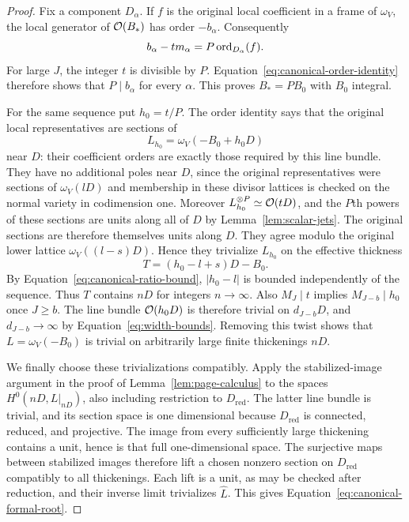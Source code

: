\begin{proof}
Fix a component $D_\alpha$. If $f$ is the original local
coefficient in a frame of $\omega_V$, the local generator
of $\mathcal O(B_*)$ has order $-b_\alpha$. Consequently
\begin{equation}\label{eq:canonical-order-identity}
 b_\alpha-tm_\alpha=P\operatorname{ord}_{D_\alpha}(f).
\end{equation}
For large $J$, the integer $t$ is divisible by $P$.
Equation~\ref{eq:canonical-order-identity} therefore shows
that $P\mid b_\alpha$ for every $\alpha$. This proves
$B_*=PB_0$ with $B_0$ integral.

For the same sequence put $h_0=t/P$. The order identity
says that the original local representatives are sections of
\[
 L_{h_0}=\omega_V(-B_0+h_0D)
\]
near $D$: their coefficient orders are exactly those
required by this line bundle. They have no additional poles
near $D$, since the original representatives were sections
of $\omega_V(lD)$ and membership in these divisor lattices
is checked on the normal variety in codimension one.
Moreover $L_{h_0}^{\otimes P}\simeq\mathcal O(tD)$, and the
$P$th powers of these sections are units along all of $D$
by Lemma~\ref{lem:scalar-jets}. The original sections are
therefore themselves units along $D$.
They agree modulo the original lower lattice
$\omega_V((l-s)D)$. Hence they trivialize $L_{h_0}$ on
the effective thickness
\[
 T=(h_0-l+s)D-B_0.
\]
By Equation~\ref{eq:canonical-ratio-bound}, $|h_0-l|$ is
bounded independently of the sequence. Thus $T$ contains
$nD$ for integers $n\to\infty$. Also $M_J\mid t$
implies $M_{J-b}\mid h_0$ once $J\geq b$.
The line bundle $\mathcal O(h_0D)$ is therefore trivial on
$d_{J-b}D$, and $d_{J-b}\to\infty$ by
Equation~\ref{eq:width-bounds}. Removing this twist shows
that $L=\omega_V(-B_0)$ is trivial on arbitrarily large
finite thickenings $nD$.

We finally choose these trivializations compatibly. Apply
the stabilized-image argument in the proof of
Lemma~\ref{lem:page-calculus} to the spaces
$H^0(nD,L|_{nD})$, also including restriction to
$D_{\mathrm{red}}$. The latter line bundle is trivial,
and its section space is one dimensional because
$D_{\mathrm{red}}$ is connected, reduced, and projective.
The image from every sufficiently large thickening contains
a unit, hence is that full one-dimensional space. The
surjective maps between stabilized images therefore lift a
chosen nonzero section on $D_{\mathrm{red}}$ compatibly to
all thickenings. Each lift is a unit, as may be checked after
reduction, and their inverse limit trivializes $\widehat L$.
This gives Equation~\ref{eq:canonical-formal-root}.
\end{proof}

